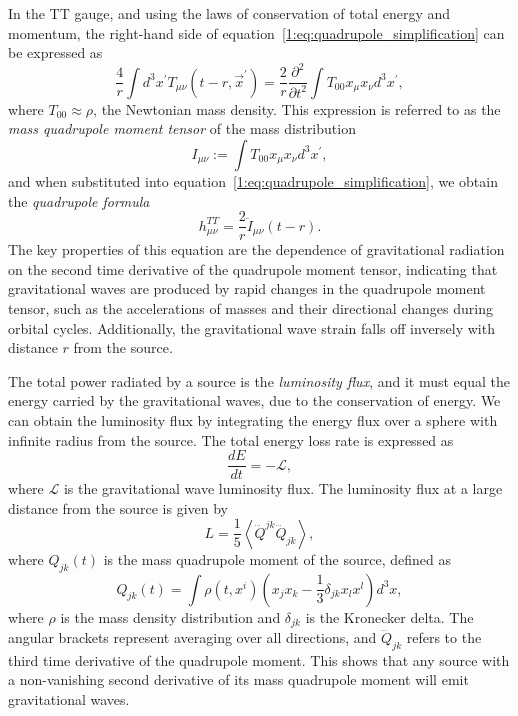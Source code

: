 In the TT gauge, and using the laws of conservation of total energy and momentum, the right-hand side of equation~\ref{1:eq:quadrupole_simplification} can be expressed as
%
\begin{equation}
    \frac{4}{r} \int d^3 x^{\prime} T_{\mu\nu}\left(t - r, \vec{x}^{\prime}\right) = \frac{2}{r}\frac{\partial^{2}}{\partial t^{2}} \int T_{00} x_{\mu} x_{\nu} d^{3} x^{\prime},
\end{equation}
%
where $T_{00} \approx \rho$, the Newtonian mass density. This expression is referred to as the \textit{mass quadrupole moment tensor} of the mass distribution
%
\begin{equation}
    I_{\mu\nu} := \int T_{00} x_{\mu} x_{\nu} d^{3} x^{\prime},
    \label{1:eq:quadrupole_moment_tensor}
\end{equation}
%
and when substituted into equation~\ref{1:eq:quadrupole_simplification}, we obtain the \textit{quadrupole formula}
%
\begin{equation}
    h^{TT}_{\mu\nu} = \frac{2}{r} \ddot{I}_{\mu\nu}(t-r).
    \label{1:eq:quadrupole_formula}
\end{equation}
%
The key properties of this equation are the dependence of gravitational radiation on the second time derivative of the quadrupole moment tensor, indicating that gravitational waves are produced by rapid changes in the quadrupole moment tensor, such as the accelerations of masses and their directional changes during orbital cycles. Additionally, the gravitational wave strain falls off inversely with distance $r$ from the source.

The total power radiated by a source is the \textit{luminosity flux}, and it must equal the energy carried by the gravitational waves, due to the conservation of energy. We can obtain the luminosity flux by integrating the energy flux over a sphere with infinite radius from the source. The total energy loss rate is expressed as
%
\begin{equation}
    \frac{dE}{dt} = -\mathcal{L},
    \label{1:eq:de_dt}
\end{equation}
%
where $\mathcal{L}$ is the gravitational wave luminosity flux. The luminosity flux at a large distance from the source is given by
%
\begin{equation}
    L = \frac{1}{5} \left\langle \dddot{Q}^{jk} \dddot{Q}_{jk} \right\rangle,
    \label{1:eq:luminosity_flux}
\end{equation}
%
where $Q_{jk}(t)$ is the mass quadrupole moment of the source, defined as
%
\begin{equation}
    Q_{jk}(t) = \int \rho(t, x^i) \left( x_j x_k - \frac{1}{3} \delta_{jk} x_l x^l \right) d^3x,
\end{equation}
%
where $\rho$ is the mass density distribution and $\delta_{jk}$ is the Kronecker delta. The angular brackets represent averaging over all directions, and $\dddot{Q}_{jk}$ refers to the third time derivative of the quadrupole moment. This shows that any source with a non-vanishing second derivative of its mass quadrupole moment will emit gravitational waves.

